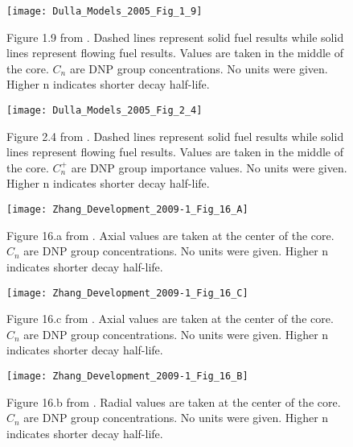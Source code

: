 \documentclass[review]{elsarticle}
\begin{document}
\begin{figure}[h]
   \centering
   \texttt{[image: Dulla\_Models\_2005\_Fig\_1\_9]}
   \caption{Figure 1.9 from \cite{dulla_models_2005}. Dashed lines represent
    solid fuel results while solid lines represent flowing fuel results. Values
    are taken in the middle of the core. $C_{n}$ are DNP group concentrations. No
    units were given. Higher n indicates shorter decay half-life.}
   \label{fig:dulla_msre_dnp_displacement}
\end{figure}

\begin{figure}[h]
   \centering
   \texttt{[image: Dulla\_Models\_2005\_Fig\_2\_4]}
   \caption{Figure 2.4 from \cite{dulla_models_2005}. Dashed lines represent
    solid fuel results while solid lines represent flowing fuel results. Values
    are taken in the middle of the core. $C_{n}^{+}$ are DNP group importance values. 
    No units were given. Higher n indicates shorter decay half-life.}
   \label{fig:dulla_msre_dnp_importance}
\end{figure}

\begin{figure}[h]
   \centering
   \texttt{[image: Zhang\_Development\_2009-1\_Fig\_16\_A]}
   \caption{Figure 16.a from \cite{zhang_development_2009-1}. 
               Axial
               values are taken at the center of the core. $C_{n}$ are DNP
               group concentrations. No units were given. Higher n indicates
               shorter decay half-life.}
   \label{fig:zhang_axial_velocity_dnp_1}
\end{figure}

\begin{figure}[h]
   \centering
   \texttt{[image: Zhang\_Development\_2009-1\_Fig\_16\_C]}
   \caption{Figure 16.c from \cite{zhang_development_2009-1}. 
               Axial
               values are taken at the center of the core. $C_{n}$ are DNP
               group concentrations. No units were given. Higher n indicates
               shorter decay half-life.}
   \label{fig:zhang_axial_velocity_dnp_2}
\end{figure}

\begin{figure}[h]
   \centering
   \texttt{[image: Zhang\_Development\_2009-1\_Fig\_16\_B]}
   \caption{Figure 16.b from \cite{zhang_development_2009-1}. 
               Radial 
               values are taken at the center of the core. $C_{n}$ are DNP
               group concentrations. No units were given. Higher n indicates
               shorter decay half-life.}
   \label{fig:zhang_radial_velocity_dnp_1}
\end{figure}
\end{document}
